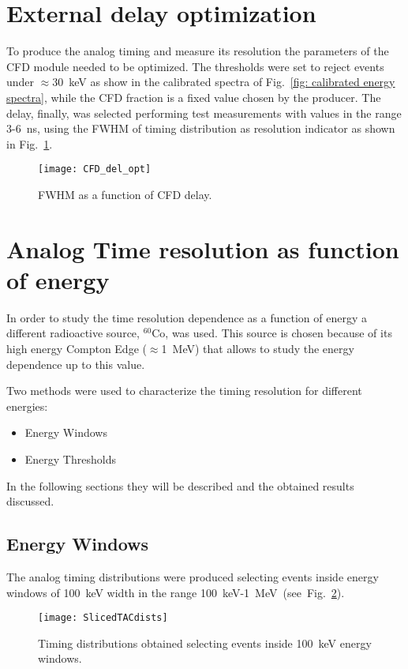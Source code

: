\section*{External delay optimization}
To produce the analog timing and measure its resolution the parameters of the CFD module needed to be optimized. The thresholds were set to reject events under $\approx$30~keV as show in the calibrated spectra of  Fig.~\ref{fig: calibrated energy spectra}, while the CFD fraction is a fixed value chosen by the producer. The delay, finally, was selected performing test measurements with values in the range 3-6~ns, using the FWHM of timing distribution as resolution indicator as shown in Fig.~\ref{Fig:CFD_Delay}.
\begin{figure}[h!]
	\centering
	\texttt{[image: CFD\_del\_opt]}
	\caption{FWHM as a function of CFD delay.}
	\label{Fig:CFD_Delay}
\end{figure}
\section*{Analog Time resolution as function of energy}
In order to study the time resolution dependence as a function of energy a different radioactive source, $^{60}$Co, was used. This source is chosen because of its high energy Compton Edge ($\approx$1~MeV) that allows to study the energy dependence up to this value. 

Two methods were used to characterize the  timing resolution for different energies: 
\begin{itemize}
	\item Energy Windows
	\item Energy Thresholds
\end{itemize} 
In the following sections they will be described and the obtained results discussed.
\newpage

\subsection*{Energy Windows}
 The analog timing distributions were produced selecting events inside energy windows of 100~keV width in the range 100~keV-1~MeV~(see~Fig.~\ref{Fig:Energy_slice}). 
\begin{figure}[h!]
	\centering
	\texttt{[image: SlicedTACdists]}
	\caption{Timing distributions obtained selecting events inside 100~keV energy windows.}
	\label{Fig:Energy_slice}
\end{figure}

